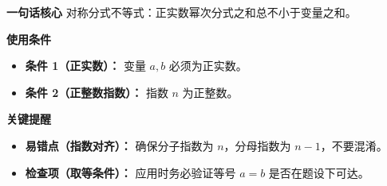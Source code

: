 \begin{summarybox}
\textbf{\textcolor{CSummary}{一句话核心}}
对称分式不等式：正实数幂次分式之和总不小于变量之和。

\medskip
\textbf{\textcolor{CSummary}{使用条件}}
\begin{itemize}[leftmargin=*, itemsep=0.5em, topsep=0.4em]
    \item \textbf{条件 1（正实数）：} 变量 $a,b$ 必须为正实数。
    \item \textbf{条件 2（正整数指数）：} 指数 $n$ 为正整数。
\end{itemize}

\medskip
\textbf{\textcolor{CSummary}{关键提醒}}
\begin{itemize}[leftmargin=*, itemsep=0.5em, topsep=0.4em]
    \item \textbf{易错点（指数对齐）：} 确保分子指数为 $n$，分母指数为 $n-1$，不要混淆。
    \item \textbf{检查项（取等条件）：} 应用时务必验证等号 $a=b$ 是否在题设下可达。
\end{itemize}
\end{summarybox}
